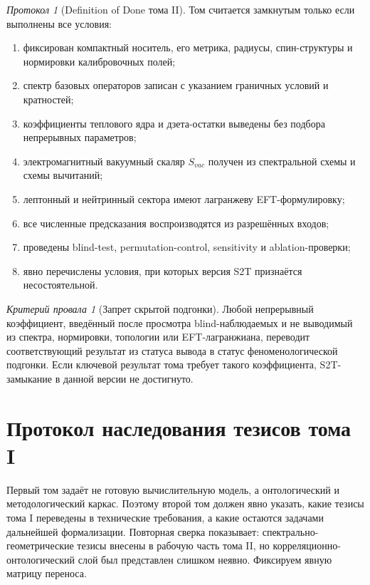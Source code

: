 \documentclass[12pt,a4paper]{report}
\theoremstyle{remark}
\newtheorem{protocol}{Протокол}[chapter]
\newtheorem{nogocriterion}{Критерий провала}[chapter]
\begin{document}
\begin{protocol}[Definition of Done тома II]
Том считается замкнутым только если выполнены все условия:
\begin{enumerate}
    \item фиксирован компактный носитель, его метрика, радиусы, спин-структуры и нормировки калибровочных полей;
    \item спектр базовых операторов записан с указанием граничных условий и кратностей;
    \item коэффициенты теплового ядра и дзета-остатки выведены без подбора непрерывных параметров;
    \item электромагнитный вакуумный скаляр \(S_{vac}\) получен из спектральной схемы и схемы вычитаний;
    \item лептонный и нейтринный сектора имеют лагранжеву EFT-формулировку;
    \item все численные предсказания воспроизводятся из разрешённых входов;
    \item проведены blind-test, permutation-control, sensitivity и ablation-проверки;
    \item явно перечислены условия, при которых версия S2T признаётся несостоятельной.
\end{enumerate}
\end{protocol}

\begin{nogocriterion}[Запрет скрытой подгонки]
Любой непрерывный коэффициент, введённый после просмотра blind-наблюдаемых и не выводимый из спектра, нормировки, топологии или EFT-лагранжиана, переводит соответствующий результат из статуса вывода в статус феноменологической подгонки. Если ключевой результат тома требует такого коэффициента, S2T-замыкание в данной версии не достигнуто.
\end{nogocriterion}


\section*{Протокол наследования тезисов тома I}

Первый том задаёт не готовую вычислительную модель, а онтологический и методологический каркас. Поэтому второй том должен явно указать, какие тезисы тома I переведены в технические требования, а какие остаются задачами дальнейшей формализации. Повторная сверка показывает: спектрально-геометрические тезисы внесены в рабочую часть тома II, но корреляционно-онтологический слой был представлен слишком неявно. Фиксируем явную матрицу переноса.
\end{document}
